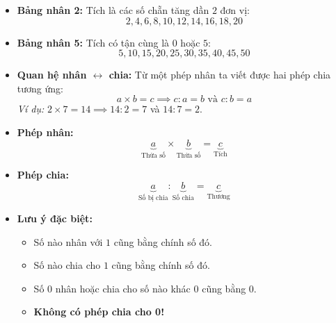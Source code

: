 \documentclass[10pt,a4paper]{article}
\begin{document}
\noindent
\begin{minipage}[t]{0.49\textwidth}\vspace{0pt}
\begin{tcolorbox}[
  enhanced,
  colback=violet!4!white,
  colframe=violet!75!black,
  arc=2mm, boxrule=0.8pt,
  left=2mm, right=2mm, top=1.8mm, bottom=1.8mm,
  title={\footnotesize\bfseries\color{white}\faKey\ 1. Bảng nhân 2, 5 và Bảng chia 2, 5}
]
{\footnotesize
\begin{itemize}\setlength{\itemsep}{1pt}\setlength{\leftskip}{-2.5mm}
  \item \textbf{Bảng nhân 2:} Tích là các số chẵn tăng dần $2$ đơn vị:
  $$2, 4, 6, 8, 10, 12, 14, 16, 18, 20$$
  \item \textbf{Bảng nhân 5:} Tích có tận cùng là $0$ hoặc $5$:
  $$5, 10, 15, 20, 25, 30, 35, 40, 45, 50$$
  \item \textbf{Quan hệ nhân $\leftrightarrow$ chia:} Từ một phép nhân ta viết được hai phép chia tương ứng:
  $$a \times b = c \implies c : a = b \text{ và } c : b = a$$
  \textit{Ví dụ:} $2 \times 7 = 14 \implies 14 : 2 = 7$ và $14 : 7 = 2$.
\end{itemize}
}
\end{tcolorbox}
\end{minipage}
\hfill
\begin{minipage}[t]{0.49\textwidth}\vspace{0pt}
\begin{tcolorbox}[
  enhanced,
  colback=teal!4!white,
  colframe=teal!75!black,
  arc=2mm, boxrule=0.8pt,
  left=2mm, right=2mm, top=1.8mm, bottom=1.8mm,
  title={\footnotesize\bfseries\color{white}\faSliders\ 2. Tên gọi thành phần phép tính}
]
{\footnotesize
\begin{itemize}\setlength{\itemsep}{1pt}\setlength{\leftskip}{-2.5mm}
  \item \textbf{Phép nhân:}
  $$\underbrace{a}_{\text{Thừa số}} \times \underbrace{b}_{\text{Thừa số}} = \underbrace{c}_{\text{Tích}}$$
  \item \textbf{Phép chia:}
  $$\underbrace{a}_{\text{Số bị chia}} : \underbrace{b}_{\text{Số chia}} = \underbrace{c}_{\text{Thương}}$$
  \item \textbf{Lưu ý đặc biệt:}
  \begin{itemize}\setlength{\itemsep}{0.5pt}\setlength{\leftskip}{-2mm}
    \item Số nào nhân với $1$ cũng bằng chính số đó.
    \item Số nào chia cho $1$ cũng bằng chính số đó.
    \item Số $0$ nhân hoặc chia cho số nào khác $0$ cũng bằng $0$.
    \item \textbf{Không có phép chia cho 0!}
  \end{itemize}
\end{itemize}
}
\end{tcolorbox}
\end{minipage}
\end{document}
